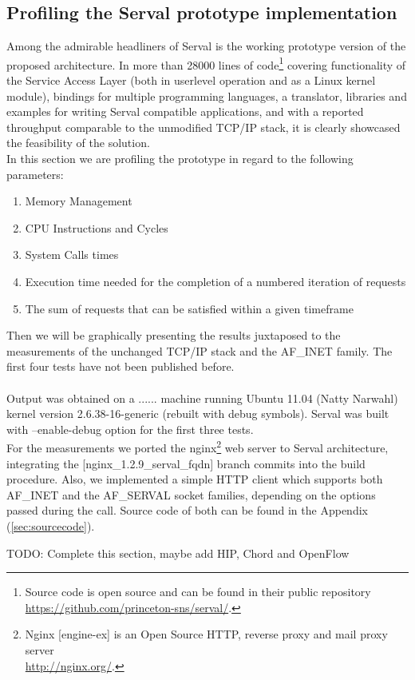 \subsection{Profiling the Serval prototype implementation}
Among the admirable headliners of Serval is the working prototype version of the proposed architecture.
In more than 28000 lines of code\footnote{Source code is open source and can be found in their public repository\\ \url{https://github.com/princeton-sns/serval/}.} covering functionality of the Service Access Layer (both in userlevel operation and as a Linux kernel module), bindings for multiple programming languages, a translator, libraries and examples for writing Serval compatible applications, and with a reported throughput comparable to the unmodified TCP/IP stack, it is clearly showcased the feasibility of the solution.\\
\indent In this section we are profiling the prototype in regard to the following parameters:
\begin{enumerate}
  \item Memory Management
  \item CPU Instructions and Cycles
  \item System Calls times
  \item Execution time needed for the completion of a numbered iteration of requests
  \item The sum of requests that can be satisfied within a given timeframe
\end{enumerate}
Then we will be graphically presenting the results juxtaposed to the measurements of the unchanged TCP/IP stack and the AF\_INET family. The first four tests have not been published before.
\paragraph{} Output was obtained on a ...... machine running Ubuntu 11.04 (Natty Narwahl) kernel version 2.6.38-16-generic (rebuilt with debug symbols). Serval was built with --enable-debug option for the first three tests.\\
For the measurements we ported the nginx\footnote{Nginx [engine-ex] is an Open Source HTTP, reverse proxy and mail proxy server\\ \url{http://nginx.org/}.} web server to Serval architecture, integrating the [nginx\_1.2.9\_serval\_fqdn] branch commits into the build procedure. Also, we implemented a simple HTTP client which supports both AF\_INET and the AF\_SERVAL socket families, depending on the options passed during the call. Source code of both can be found in the Appendix (\ref{sec:sourcecode}).


\iffalse
gprof
perf
google-profile tools
1) memory (oprofile)
2) CPU cycles (callgrind)
3) system calls time (strace)
4) timed execution of 1000 times
5) requests per second
6) Number of packers per request, bytes sent, packet structure
\fi

TODO: Complete this section, maybe add HIP, Chord and OpenFlow